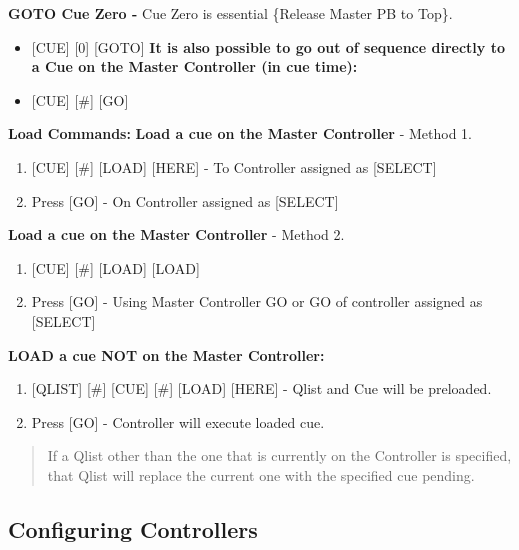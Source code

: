 \documentclass[
]{article}
\begin{document}
\textbf{GOTO Cue Zero -} Cue Zero is essential \{Release Master PB to Top\}.

\begin{itemize}
\item
  {[}CUE{]} {[}0{]} {[}GOTO{]} \textbf{It is also possible to go out of sequence directly to a Cue on the Master Controller (in cue time):}
\item
  {[}CUE{]} {[}\#{]} {[}GO{]}
\end{itemize}

\textbf{Load Commands:} \textbf{Load a cue on the Master Controller} - Method 1.

\begin{enumerate}
\def\labelenumi{\arabic{enumi}.}
\item
  {[}CUE{]} {[}\#{]} {[}LOAD{]} {[}HERE{]} - To Controller assigned as {[}SELECT{]}
\item
  Press {[}GO{]} - On Controller assigned as {[}SELECT{]}
\end{enumerate}

\textbf{Load a cue on the Master Controller} - Method 2.

\begin{enumerate}
\def\labelenumi{\arabic{enumi}.}
\item
  {{[}CUE{]} {[}\#{]} {[}LOAD{]} {[}LOAD{]}}
\item
  {Press {[}GO{]} - Using Master Controller GO or GO of controller assigned as {[}SELECT{]} }
\end{enumerate}

\textbf{LOAD a cue NOT on the Master Controller:}

\begin{enumerate}
\def\labelenumi{\arabic{enumi}.}
\item
  {[}QLIST{]} {[}\#{]} {[}CUE{]} {[}\#{]} {[}LOAD{]} {[}HERE{]} - Qlist and Cue will be preloaded.
\item
  Press {[}GO{]} - Controller will execute loaded cue.
\end{enumerate}

\begin{quote}
If a Qlist other than the one that is currently on the Controller is specified, that Qlist will replace the current one with the specified cue pending.
\end{quote}

\hypertarget{configuring-controllers}{%
\subsection{Configuring Controllers}\label{configuring-controllers}}
\end{document}
